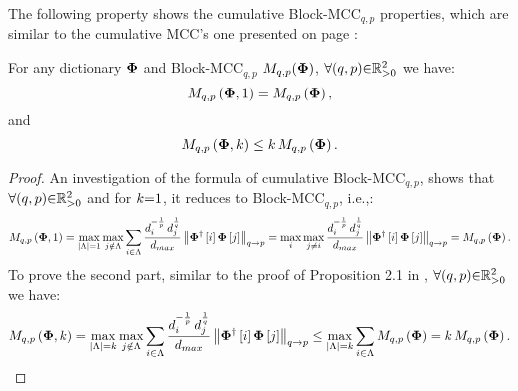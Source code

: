 The following property shows the cumulative Block-MCC$_{q,p}$ properties, which are similar to the cumulative MCC's one presented on page \pageref{txt:CMCC-properties}:
\begin{property}
\label{prp:CBMIC-BMIC}
For any dictionary $\boldsymbol{\Phi}$  and Block-MCC$_{q,p}$ $M_{q,p}(\boldsymbol{\Phi})$, $\forall (q , p) {\in} \mathbb{R}^2_{{>} 0}$ we have:
\begin{equation*}
M_{q,p}\left( \boldsymbol{\Phi} , 1 \right) = M_{q,p}\left( \boldsymbol{\Phi} \right),
\end{equation*}
and
\begin{equation*}
M_{q,p}\left( \boldsymbol{\Phi} , k \right) \leq k \, M_{q,p}\left( \boldsymbol{\Phi} \right).
\end{equation*}
\end{property}
\begin{proof}
An investigation of the formula of cumulative Block-MCC$_{q,p}$, shows that $\forall (q , p) {\in} \mathbb{R}^2_{{>} 0}$ and for $k {=} 1$, it reduces to Block-MCC$_{q,p}$, i.e.,:
\begin{gather*}
\begin{aligned}
M_{q,p}\left( \boldsymbol{\Phi} , 1 \right) 
= \max_{\left\lvert\Lambda\right\rvert=1} \max_{j \notin \Lambda} \sum_{i \in \Lambda} \frac{d_{i}^{-\frac1p} \, d_{j}^{\frac1q}}{d_{max}} \left\lVert\boldsymbol{\Phi}^\dagger\left[ i \right] \boldsymbol{\Phi} \left[ j \right]\right\rVert_{q \to p} 
=\max_{i} \max_{j \neq i} \frac{d_{i}^{-\frac1p} \, d_{j}^{\frac1q}}{d_{max}} \left\lVert\boldsymbol{\Phi}^\dagger\left[ i \right] \boldsymbol{\Phi} \left[ j \right]\right\rVert_{q \to p} 
= M_{q,p}\left( \boldsymbol{\Phi} \right).
\end{aligned}
\end{gather*} 
To prove the second part, similar to the proof of Proposition 2.1 in \cite{Tropp2004}, $\forall (q , p) {\in} \mathbb{R}^2_{{>} 0}$ we have:
\begin{equation*}
\begin{aligned}
M_{q,p}\left( \boldsymbol{\Phi} , k \right) 
= \max_{\left\lvert\Lambda\right\rvert=k} \max_{j \notin \Lambda} \sum_{i \in \Lambda} \frac{d_{i}^{-\frac1p} \, d_{j}^{\frac1q}}{d_{max}} \left\lVert\boldsymbol{\Phi}^\dagger\left[ i \right] \boldsymbol{\Phi} \left[ j \right]\right\rVert_{q \to p} 
\leq \max_{\left\lvert\Lambda\right\rvert=k} \sum_{i \in \Lambda} M_{q,p}\left( \boldsymbol{\Phi} \right)
= k \, M_{q,p}\left( \boldsymbol{\Phi} \right).
\end{aligned}
\end{equation*}
\end{proof}
